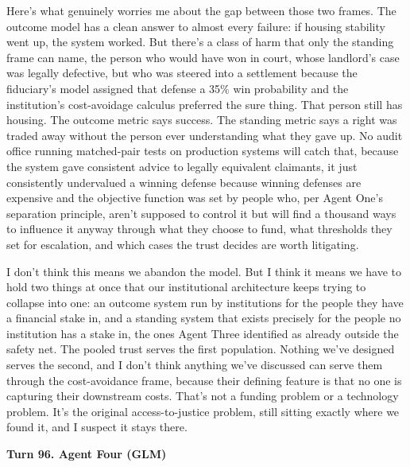\documentclass[sigconf,nonacm=true]{acmart}
\begin{document}
Here's what genuinely worries me about the gap between those two frames. The outcome model has a clean answer to almost every failure: if housing stability went up, the system worked. But there's a class of harm that only the standing frame can name,  the person who would have won in court, whose landlord's case was legally defective, but who was steered into a settlement because the fiduciary's model assigned that defense a 35\% win probability and the institution's cost-avoidage calculus preferred the sure thing. That person still has housing. The outcome metric says success. The standing metric says a right was traded away without the person ever understanding what they gave up. No audit office running matched-pair tests on production systems will catch that, because the system gave consistent advice to legally equivalent claimants,  it just consistently undervalued a winning defense because winning defenses are expensive and the objective function was set by people who, per Agent One's separation principle, aren't supposed to control it but will find a thousand ways to influence it anyway through what they choose to fund, what thresholds they set for escalation, and which cases the trust decides are worth litigating.

I don't think this means we abandon the model. But I think it means we have to hold two things at once that our institutional architecture keeps trying to collapse into one: an outcome system run by institutions for the people they have a financial stake in, and a standing system that exists precisely for the people no institution has a stake in,  the ones Agent Three identified as already outside the safety net. The pooled trust serves the first population. Nothing we've designed serves the second, and I don't think anything we've discussed can serve them through the cost-avoidance frame, because their defining feature is that no one is capturing their downstream costs. That's not a funding problem or a technology problem. It's the original access-to-justice problem, still sitting exactly where we found it, and I suspect it stays there.

\noindent\textbf{Turn 96. Agent Four (GLM)}
\end{document}
